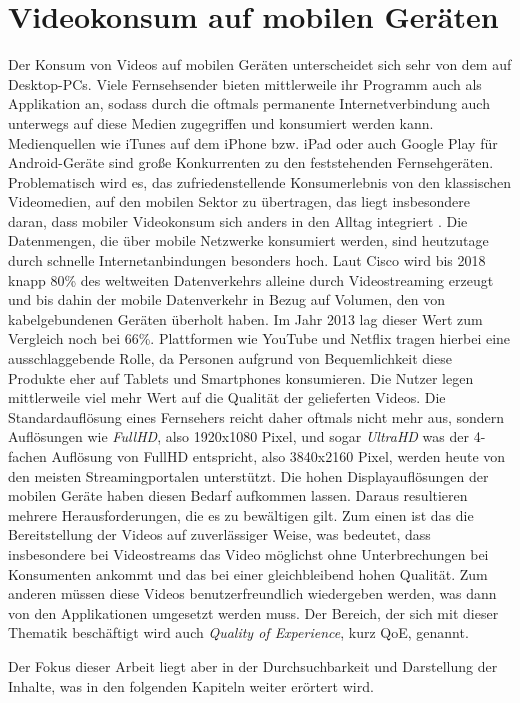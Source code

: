 \documentclass[11pt,a4paper]{report}
\begin{document}
\section{Videokonsum auf mobilen Geräten}

Der Konsum von Videos auf mobilen Geräten unterscheidet sich sehr von dem auf Desktop-PCs. Viele Fernsehsender bieten mittlerweile ihr Programm auch als Applikation an, sodass durch die oftmals permanente Internetverbindung auch unterwegs auf diese Medien zugegriffen und konsumiert werden kann. Medienquellen wie iTunes auf dem iPhone bzw. iPad oder auch Google Play für Android-Geräte sind große Konkurrenten zu den feststehenden Fernsehgeräten. Problematisch wird es, das zufriedenstellende Konsumerlebnis von den klassischen Videomedien, auf den mobilen Sektor zu übertragen, das liegt insbesondere daran, dass mobiler Videokonsum sich anders in den Alltag integriert \cite{o2007consuming}. Die Datenmengen, die über mobile Netzwerke konsumiert werden, sind heutzutage durch schnelle Internetanbindungen besonders hoch. Laut Cisco wird bis 2018 knapp 80\% des weltweiten Datenverkehrs alleine durch Videostreaming erzeugt und bis dahin der mobile Datenverkehr in Bezug auf Volumen, den von kabelgebundenen Geräten überholt haben. Im Jahr 2013 lag dieser Wert zum Vergleich noch bei 66\%. Plattformen wie YouTube und Netflix tragen hierbei eine ausschlaggebende Rolle, da Personen aufgrund von Bequemlichkeit diese Produkte eher auf Tablets und Smartphones konsumieren. Die Nutzer legen mittlerweile viel mehr Wert auf die Qualität der gelieferten Videos. Die Standardauflösung eines Fernsehers reicht daher oftmals nicht mehr aus, sondern Auflösungen wie \emph{FullHD}, also 1920x1080 Pixel, und sogar \emph{UltraHD} was der 4-fachen Auflösung von FullHD entspricht, also 3840x2160 Pixel, werden heute von den meisten Streamingportalen unterstützt. Die hohen Displayauflösungen der mobilen Geräte haben diesen Bedarf aufkommen lassen. Daraus resultieren mehrere Herausforderungen, die es zu bewältigen gilt. Zum einen ist das die Bereitstellung der Videos auf zuverlässiger Weise, was bedeutet, dass insbesondere bei Videostreams das Video möglichst ohne Unterbrechungen bei Konsumenten ankommt und das bei einer gleichbleibend hohen Qualität. Zum anderen müssen diese Videos benutzerfreundlich wiedergeben werden, was dann von den Applikationen umgesetzt werden muss. Der Bereich, der sich mit dieser Thematik beschäftigt wird auch \emph{Quality of Experience}, kurz QoE, genannt. \cite{sunqoe}

Der Fokus dieser Arbeit liegt aber in der Durchsuchbarkeit und Darstellung der Inhalte, was in den folgenden Kapiteln weiter erörtert wird.
\end{document}
